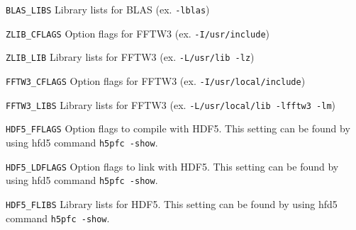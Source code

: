 \begin{description}
\item{\verb|BLAS_LIBS|} Library lists for BLAS  (ex.  \verb|-lblas|)
\item{\verb|ZLIB_CFLAGS|} Option flags for FFTW3  (ex.  \verb|-I/usr/include|)
\item{\verb|ZLIB_LIB|}   Library lists for FFTW3 (ex. \verb|-L/usr/lib -lz|)
\item{\verb|FFTW3_CFLAGS|} Option flags for FFTW3  (ex.  \verb|-I/usr/local/include|)
\item{\verb|FFTW3_LIBS|}   Library lists for FFTW3 (ex. \verb|-L/usr/local/lib -lfftw3 -lm|)
\item{\verb|HDF5_FFLAGS|}  Option flags to compile with HDF5. This setting can be found by using hfd5 command \verb|h5pfc -show|.

\item{\verb|HDF5_LDFLAGS|}    Option flags  to link with  HDF5. This setting can be found by using hfd5 command \verb|h5pfc -show|.

\item{\verb|HDF5_FLIBS|}   Library lists for HDF5. This setting can be found by using hfd5 command \verb|h5pfc -show|.

\end{description}
%

